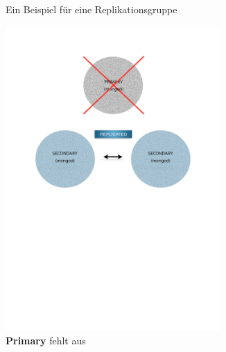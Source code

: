 \begin{figure}[H]
\begin{subfigure}[t]{0.49\textwidth}
      \caption[Ein Beispiel für eine Replikationsgruppe]{Ein Beispiel für eine Replikationsgruppe}
      \label{img:createReplicaSet}
   \end{subfigure}\hfill%
   \begin{subfigure}[t]{0.49\textwidth}\vspace{0pt}
   \centering
      \includegraphics[trim = 28mm 139mm 28mm 29mm, clip, width=0.9\textwidth]{resources/replicaSet/selectNewPrimary}
     \caption[\textbf{Primary} fehlt aus]{\textbf{Primary} fehlt aus}
      \label{img:selectNewPrimary}
   \end{subfigure}\\[5pt]%
   \centering
   \begin{subfigure}[t]{0.49\textwidth}\vspace{0pt}
   \centering

\end{subfigure}
\end{figure}

